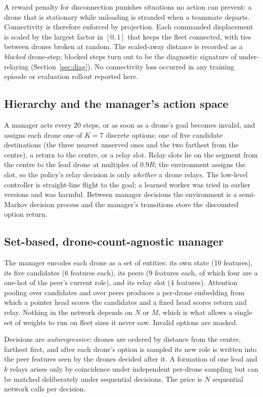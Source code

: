 \documentclass[12pt]{article}
\begin{document}
A reward penalty for disconnection punishes situations no action can prevent: a drone that is
stationary while unloading is stranded when a teammate departs. Connectivity is therefore
enforced by projection. Each commanded displacement is scaled by the largest factor in $[0,1]$
that keeps the fleet connected, with ties between drones broken at random. The scaled-away
distance is recorded as a \emph{blocked} drone-step; blocked steps turn out to be the diagnostic
signature of under-relaying (Section~\ref{sec:diag}). No connectivity loss occurred in any
training episode or evaluation rollout reported here.

\subsection{Hierarchy and the manager's action space}

A manager acts every $20$ steps, or as soon as a drone's goal becomes invalid, and assigns each
drone one of $K = 7$ discrete options: one of five candidate destinations (the three nearest
unserved ones and the two farthest from the centre), a return to the centre, or a relay slot.
Relay slots lie on the segment from the centre to the lead drone at multiples of $0.9R$; the
environment assigns the slot, so the policy's relay decision is only \emph{whether} a drone
relays. The low-level controller is straight-line flight to the goal; a learned worker was tried
in earlier versions and was harmful. Between manager decisions the environment is a semi-Markov
decision process and the manager's transitions store the discounted option return.

\subsection{Set-based, drone-count-agnostic manager}

The manager encodes each drone as a set of entities: its own state (10 features), its five
candidates (6 features each), its peers (9 features each, of which four are a one-hot of the
peer's current role), and its relay slot (4 features). Attention pooling over candidates and
over peers produces a per-drone embedding from which a pointer head scores the candidates and a
fixed head scores return and relay. Nothing in the network depends on $N$ or $M$, which is what
allows a single set of weights to run on fleet sizes it never saw. Invalid options are masked.

Decisions are \emph{autoregressive}: drones are ordered by distance from the centre, farthest
first, and after each drone's option is sampled its new role is written into the peer features
seen by the drones decided after it. A formation of one lead and $k$ relays arises only by
coincidence under independent per-drone sampling but can be matched deliberately under
sequential decisions. The price is $N$ sequential network calls per decision.
\end{document}
